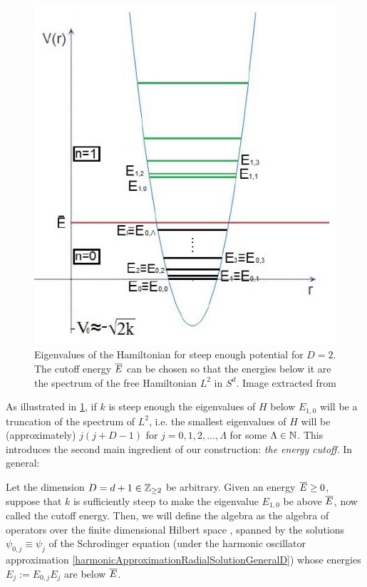 \begin{figure}[h][h]
    \centering
    \includegraphics[width = 2\textwidth/3/2]{images/FioreEigenvalues.PNG}
    \caption{Eigenvalues of the Hamiltonian for steep enough potential for $D = 2$. The cutoff energy $\overline{E}$ can be chosen so that the energies below it are the spectrum of the free Hamiltonian $L^2$ in $S^d$. Image extracted from \cite{Fiore2018}}
    \label{fig:D2EigenvaluesEigenEnergiesHarmonicCutoff}
\end{figure}

As illustrated in \ref{fig:D2EigenvaluesEigenEnergiesHarmonicCutoff}, if $k$ is steep enough%
the eigenvalues of $H$ below $E_{1,0}$ will be a truncation of the spectrum of $L^2$, i.e. the smallest eigenvalues of $H$ will be (approximately) $j(j+D-1)$ for $j = 0, 1, 2, \dots, \Lambda$ for some $\Lambda \in \mathbb{N}$. This introduces the second main ingredient of our construction: \emph{the energy cutoff}. In general:
\begin{definition}\label{definitionAcalHcalGeneralD}
Let the dimension $D = d + 1 \in \mathbb{Z}_{\geq 2}$ be arbitrary. Given an energy $\overline{E} \geq 0$, suppose that $k$ is sufficiently steep to make the eigenvalue $E_{1, 0}$ be above $\overline{E}$, now called the cutoff energy. %
Then, we will define the algebra  as the algebra of operators over the finite dimensional Hilbert space , spanned by the solutions $\psi_{0, j} \equiv \psi_j$ of the Schrodinger equation (under the harmonic oscillator approximation \eqref{harmonicApproximationRadialSolutionGeneralD}) whose energies $E_j := E_{0, j}E_j$ are below $\overline{E}$.
\end{definition}

